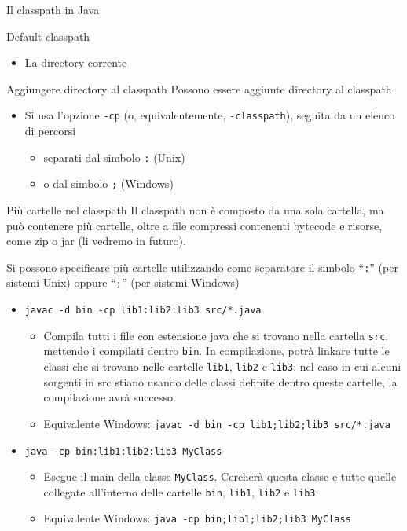 \documentclass[xcolor=dvipsnames,presentation]{beamer}
\begin{document}
\begin{frame}[allowframebreaks]{Il classpath in Java}
\begin{block}{Default classpath}
\begin{itemize}
\begin{itemize}
				\item Contengono ad esempio \texttt{java.lang.Math}
			\end{itemize}
			\item La directory corrente
		\end{itemize}
	\end{block}
	\begin{block}{Aggiungere directory al classpath}
		Possono essere aggiunte directory al classpath
		\begin{itemize}
			\item Si usa l'opzione \texttt{-cp} (o, equivalentemente, \texttt{-classpath}), seguita da un elenco di percorsi
			\begin{itemize}
				\item separati dal simbolo \texttt{:} (Unix)
				\item o dal simbolo \texttt{;} (Windows)
			\end{itemize}
		\end{itemize}
	\end{block}
\end{frame}

\begin{frame}{Più cartelle nel classpath}
	Il classpath non è composto da una sola cartella, ma può contenere più cartelle, oltre a file compressi contenenti bytecode e risorse, come zip o jar (li vedremo in futuro).
	\begin{block}{}
		Si possono specificare più cartelle utilizzando come separatore il simbolo ``\texttt{:}'' (per sistemi Unix) oppure ``\texttt{;}'' (per sistemi Windows)
		\begin{itemize}
			\item \texttt{javac -d bin -cp lib1:lib2:lib3 src/*.java}
			\begin{itemize}
				\item Compila tutti i file con estensione java che si trovano nella cartella \texttt{src}, mettendo i compilati dentro \texttt{bin}. In compilazione, potrà linkare tutte le classi che si trovano nelle cartelle \texttt{lib1}, \texttt{lib2} e \texttt{lib3}: nel caso in cui alcuni sorgenti in src stiano usando delle classi definite dentro queste cartelle, la compilazione avrà successo.
				\item \scriptsize{Equivalente Windows: \texttt{javac -d bin -cp lib1;lib2;lib3 src/*.java}}
		\end{itemize}
			\item \texttt{java -cp bin:lib1:lib2:lib3 MyClass}
			\begin{itemize}
				\item Esegue il main della classe \texttt{MyClass}. Cercherà questa classe e tutte quelle collegate all'interno delle cartelle \texttt{bin}, \texttt{lib1}, \texttt{lib2} e \texttt{lib3}.
				\item \scriptsize{Equivalente Windows: \texttt{java -cp bin;lib1;lib2;lib3 MyClass}}
			\end{itemize}
		\end{itemize}
	\end{block}
\end{frame}
\end{document}
